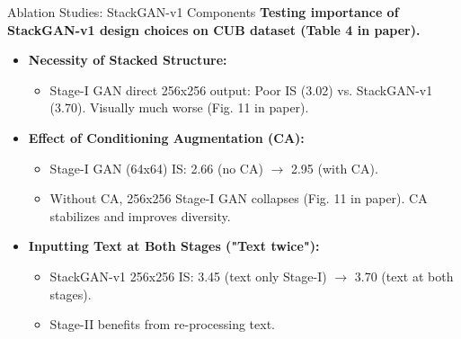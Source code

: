 \documentclass{beamer}
\newcommand{\paperfigure}[3][width=\textwidth]{%
    \begin{figure}%
        \centering%
        \texttt{[image: figures/\#2.png]}%
        \caption{#3 (Source:~\cite{stackgan++})}%
    \end{figure}%
}
\begin{document}
\begin{frame}{Ablation Studies: StackGAN-v1 Components}
    \textbf{Testing importance of StackGAN-v1 design choices on CUB dataset (Table 4 in paper).}
    \begin{itemize}
        \item \textbf{Necessity of Stacked Structure:}
            \begin{itemize}
                \item Stage-I GAN direct 256x256 output: Poor IS (3.02) vs. StackGAN-v1 (3.70). Visually much worse (Fig. 11 in paper).
            \end{itemize}
        \item \textbf{Effect of Conditioning Augmentation (CA):}
            \begin{itemize}
                \item Stage-I GAN (64x64) IS: 2.66 (no CA) $\rightarrow$ 2.95 (with CA).
                \item Without CA, 256x256 Stage-I GAN collapses (Fig. 11 in paper). CA stabilizes and improves diversity.
            \end{itemize}
        \item \textbf{Inputting Text at Both Stages ("Text twice"):}
            \begin{itemize}
                \item StackGAN-v1 256x256 IS: 3.45 (text only Stage-I) $\rightarrow$ 3.70 (text at both stages).
                \item Stage-II benefits from re-processing text.
            \end{itemize}
    \end{itemize}
\end{frame}
\end{document}
